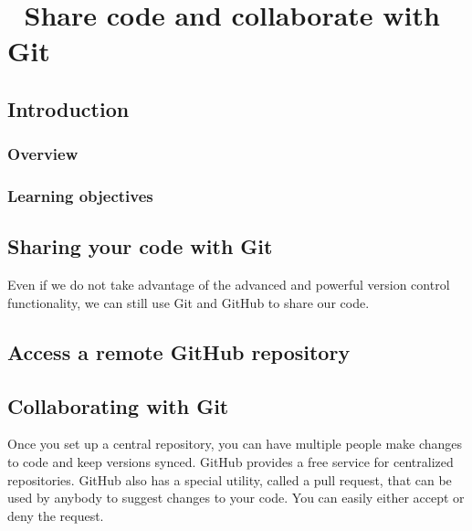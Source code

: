 \documentclass[
  letterpaper,
  DIV=11,
  numbers=noendperiod,
  oneside]{scrreprt}
\begin{document}
\hypertarget{share-code-and-collaborate-with-git}{%
\chapter{\texorpdfstring{{📘} Share code and collaborate with
Git}{📘 Share code and collaborate with Git}}\label{share-code-and-collaborate-with-git}}

\hypertarget{introduction-9}{%
\section{Introduction}\label{introduction-9}}

\hypertarget{overview-5}{%
\subsection{Overview}\label{overview-5}}

\hypertarget{learning-objectives-6}{%
\subsection{Learning objectives}\label{learning-objectives-6}}

\hypertarget{sharing-your-code-with-git}{%
\section{Sharing your code with Git}\label{sharing-your-code-with-git}}

Even if we do not take advantage of the advanced and powerful version
control functionality, we can still use Git and GitHub to share our
code.

\hypertarget{access-a-remote-github-repository}{%
\section{Access a remote GitHub
repository}\label{access-a-remote-github-repository}}

\hypertarget{collaborating-with-git}{%
\section{Collaborating with Git}\label{collaborating-with-git}}

Once you set up a central repository, you can have multiple people make
changes to code and keep versions synced. GitHub provides a free service
for centralized repositories. GitHub also has a special utility, called
a pull request, that can be used by anybody to suggest changes to your
code. You can easily either accept or deny the request.
\end{document}
